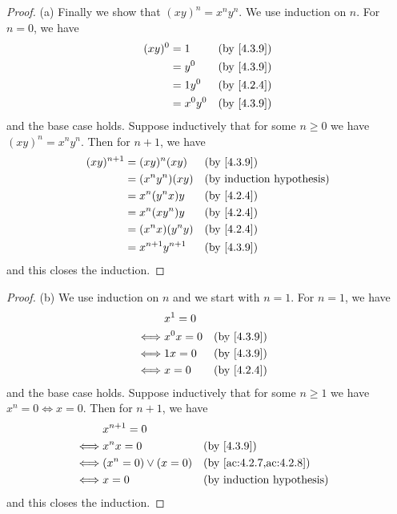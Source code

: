 \begin{proof}{(a)}
  Finally we show that \((xy)^n = x^n y^n\).
  We use induction on \(n\).
  For \(n = 0\), we have
  \begin{align*}
    (xy)^0 & = 1       &  & \by{4.3.9} \\
           & = y^0     &  & \by{4.3.9} \\
           & = 1y^0    &  & \by{4.2.4} \\
           & = x^0 y^0 &  & \by{4.3.9}
  \end{align*}
  and the base case holds.
  Suppose inductively that for some \(n \geq 0\) we have \((xy)^n = x^n y^n\).
  Then for \(n + 1\), we have
  \begin{align*}
    (xy)^{n + 1} & = (xy)^n (xy)         &  & \by{4.3.9} \\
                 & = (x^n y^n) (xy)      &  & \byIH      \\
                 & = x^n (y^n x) y       &  & \by{4.2.4} \\
                 & = x^n (x y^n) y       &  & \by{4.2.4} \\
                 & = (x^n x)(y^n y)      &  & \by{4.2.4} \\
                 & = x^{n + 1} y^{n + 1} &  & \by{4.3.9}
  \end{align*}
  and this closes the induction.
\end{proof}

\begin{proof}{(b)}
  We use induction on \(n\) and we start with \(n = 1\).
  For \(n = 1\), we have
  \begin{align*}
         & x^1 = 0                   \\
    \iff & x^0 x = 0 &  & \by{4.3.9} \\
    \iff & 1x = 0    &  & \by{4.3.9} \\
    \iff & x = 0     &  & \by{4.2.4}
  \end{align*}
  and the base case holds.
  Suppose inductively that for some \(n \geq 1\) we have \(x^n = 0 \iff x = 0\).
  Then for \(n + 1\), we have
  \begin{align*}
         & x^{n + 1} = 0                                                    \\
    \iff & x^n x = 0              &  & \by{4.3.9}                           \\
    \iff & (x^n = 0) \lor (x = 0) &  & \text{(by \cref{ac:4.2.7,ac:4.2.8})} \\
    \iff & x = 0                  &  & \byIH
  \end{align*}
  and this closes the induction.
\end{proof}

